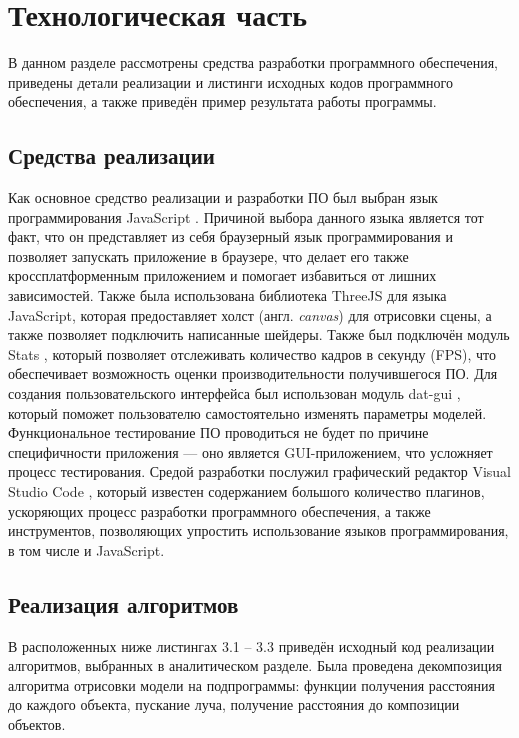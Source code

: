 \section{Технологическая часть}

В  данном  разделе  рассмотрены  средства  разработки  программного 
обеспечения, приведены детали реализации и листинги исходных кодов 
программного обеспечения, а также приведён пример результата работы программы.

\subsection{Средства реализации}
Как  основное  средство  реализации  и  разработки  ПО  был  выбран  язык 
программирования  JavaScript \cite{js}.
Причиной  выбора  данного  языка  является  тот факт,  что  он  представляет из себя браузерный язык  программирования  и  позволяет запускать приложение в браузере, что делает его также кроссплатформенным приложением  и  помогает  избавиться  от  лишних  зависимостей. 
Также  была использована библиотека ThreeJS \cite{threejs} для языка JavaScript, которая предоставляет холст  (англ.  \textit{canvas})  для  отрисовки  сцены,  а  также  позволяет  подключить написанные шейдеры.
Также был подключён модуль Stats \cite{stats}, который позволяет 
отслеживать  количество  кадров  в  секунду  (FPS),  что  обеспечивает возможность оценки 
производительности  получившегося  ПО.
Для  создания  пользовательского интерфейса  был  использован  модуль  dat-gui \cite{datgui},  который  поможет  пользователю 
самостоятельно  изменять  параметры  моделей.
Функциональное  тестирование ПО  проводиться  не  будет  по  причине  специфичности  приложения  --- оно является  GUI-приложением,  что  усложняет  процесс  тестирования.
Средой разработки  послужил  графический  редактор  Visual  Studio  Code \cite{vscode},  который 
известен  содержанием  большого  количество  плагинов,  ускоряющих  процесс 
разработки  программного  обеспечения,  а  также  инструментов,  позволяющих 
упростить использование языков программирования, в том числе и JavaScript.


\subsection{Реализация алгоритмов}

В  расположенных  ниже  листингах  3.1  --  3.3  приведён  исходный  код 
реализации алгоритмов, выбранных в аналитическом разделе.
Была проведена декомпозиция  алгоритма  отрисовки  модели  на  подпрограммы:  функции 
получения расстояния до каждого объекта, пускание луча, получение расстояния 
до композиции объектов.


